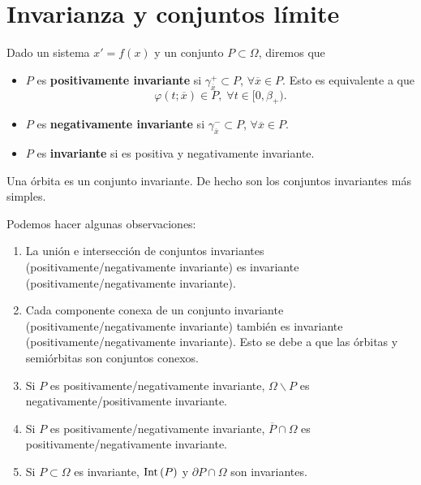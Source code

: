 \chapter{Invarianza y conjuntos límite}
\begin{definition}[Invarianza]
Dado un sistema $\displaystyle x' = f\left(x\right) $ y un conjunto $\displaystyle P \subset \Omega  $, diremos que 
\begin{itemize}
\item $\displaystyle P $ es \textbf{positivamente invariante} si $\displaystyle \gamma^{+}_{\overline{x}}\subset P $, $\displaystyle \forall \overline{x}\in P $. Esto es equivalente a que
	\[\varphi\left(t; \overline{x}\right)\in P, \; \forall t \in [0, \beta_{+}) .\]
\item $\displaystyle P $ es \textbf{negativamente invariante} si $\displaystyle \gamma^{-}_{\overline{x}}\subset P $, $\displaystyle \forall \overline{x}\in P $. 
\item $\displaystyle P $ es \textbf{invariante} si es positiva y negativamente invariante.
\end{itemize}
\end{definition}
\begin{eg}
Una órbita es un conjunto invariante. De hecho son los conjuntos invariantes más simples. 
\end{eg}
\begin{observation}
Podemos hacer algunas observaciones:
\begin{enumerate}
\item La unión e intersección de conjuntos invariantes (positivamente/negativamente invariante) es invariante (positivamente/negativamente invariante). 
\item Cada componente conexa de un conjunto invariante (positivamente/negativamente invariante) también es invariante (positivamente/negativamente invariante). Esto se debe a que las órbitas y semiórbitas son conjuntos conexos. 
\item Si $\displaystyle P $ es positivamente/negativamente invariante, $\displaystyle \Omega \backslash P $ es negativamente/positivamente invariante. 
\item Si $\displaystyle P $ es positivamente/negativamente invariante, $\displaystyle \overline{P}\cap \Omega  $ es positivamente/negativamente invariante. 
\item Si $\displaystyle P\subset \Omega  $ es invariante, $\displaystyle \operatorname{Int}\left(P\right) $ y $\displaystyle \partial P\cap \Omega  $ son invariantes. 
\end{enumerate}
\end{observation}
